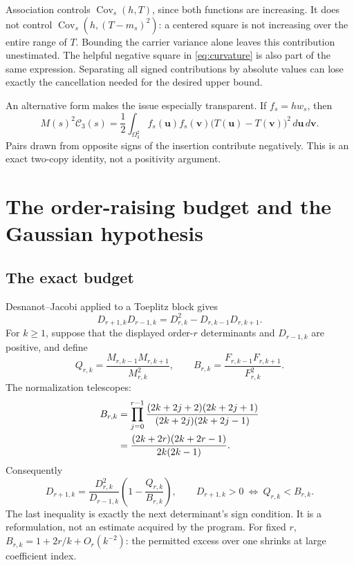 \documentclass[11pt,letterpaper]{article}
\numberwithin{equation}{section}
\theoremstyle{remark}
\DeclareMathOperator{\Cov}{Cov}
\newcommand{\dd}{\,d}
\begin{document}
Association controls $\Cov_s(h,T)$, since both functions are increasing.
It does not control $\Cov_s(h,(T-m_s)^2)$: a centered square is not
increasing over the entire range of $T$. Bounding the carrier variance
alone leaves this contribution unestimated. The helpful negative square
in \eqref{eq:curvature} is also part of the same expression. Separating
all signed contributions by absolute values can lose exactly the
cancellation needed for the desired upper bound.

An alternative form makes the issue especially transparent. If
$f_s=h w_s$, then
\begin{equation}
 M(s)^2\mathcal C_3(s)
 =\frac12\int_{\Omega_3^2}
 f_s(\mathbf u)f_s(\mathbf v)
 \bigl(T(\mathbf u)-T(\mathbf v)\bigr)^2\dd\mathbf u\dd\mathbf v.
 \label{eq:twocopycurv}
\end{equation}
Pairs drawn from opposite signs of the insertion contribute negatively.
This is an exact two-copy identity, not a positivity argument.

\section{The order-raising budget and the Gaussian hypothesis}
\label{sec:budget}

\subsection{The exact budget}

Desnanot--Jacobi applied to a Toeplitz block gives
\begin{equation}
 D_{r+1,k}D_{r-1,k}=D_{r,k}^2-D_{r,k-1}D_{r,k+1}.
 \label{eq:dj}
\end{equation}
For $k\ge1$, suppose that the displayed order-$r$ determinants and
$D_{r-1,k}$ are positive, and define
\begin{equation}
 Q_{r,k}=\frac{M_{r,k-1}M_{r,k+1}}{M_{r,k}^2},\qquad
 B_{r,k}=\frac{F_{r,k-1}F_{r,k+1}}{F_{r,k}^2}.
\end{equation}
The normalization telescopes:
\begin{align}
 B_{r,k}
 &=\prod_{j=0}^{r-1}
 \frac{(2k+2j+2)(2k+2j+1)}{(2k+2j)(2k+2j-1)}\notag\\
 &=\frac{(2k+2r)(2k+2r-1)}{2k(2k-1)}. \label{eq:B}
\end{align}
Consequently
\begin{equation}
 D_{r+1,k}=\frac{D_{r,k}^2}{D_{r-1,k}}
                  \left(1-\frac{Q_{r,k}}{B_{r,k}}\right),
 \qquad D_{r+1,k}>0\ \Longleftrightarrow\ Q_{r,k}<B_{r,k}.
 \label{eq:exactsign}
\end{equation}
The last inequality is exactly the next determinant's sign condition.
It is a reformulation, not an estimate acquired by the program.
For fixed $r$, $B_{r,k}=1+2r/k+O_r(k^{-2})$: the permitted excess
over one shrinks at large coefficient index.
\end{document}
